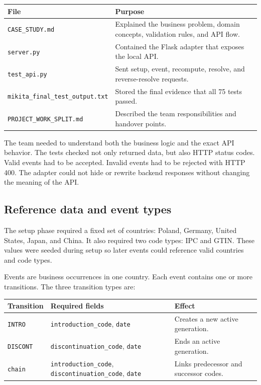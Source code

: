 \documentclass[12pt]{article}
\begin{document}
\begin{longtable}{|p{}|p{}|}
\hline
\textbf{File} & \textbf{Purpose} \\
\hline
\texttt{CASE\_STUDY.md} & Explained the business problem, domain concepts, validation rules, and API flow. \\
\hline
\texttt{server.py} & Contained the Flask adapter that exposes the local API. \\
\hline
\texttt{test\_api.py} & Sent setup, event, recompute, resolve, and reverse-resolve requests. \\
\hline
\texttt{mikita\_final\_test\_output.txt} & Stored the final evidence that all 75 tests passed. \\
\hline
\texttt{PROJECT\_WORK\_SPLIT.md} & Described the team responsibilities and handover points. \\
\hline
\end{longtable}

The team needed to understand both the business logic and the exact API behavior. The tests checked not only returned data, but also HTTP status codes. Valid events had to be accepted. Invalid events had to be rejected with HTTP 400. The adapter could not hide or rewrite backend responses without changing the meaning of the API.

\subsection{Reference data and event types}

The setup phase required a fixed set of countries: Poland, Germany, United States, Japan, and China. It also required two code types: IPC and GTIN. These values were seeded during setup so later events could reference valid countries and code types.

Events are business occurrences in one country. Each event contains one or more transitions. The three transition types are:

\begin{longtable}{|p{}|p{}|p{}|}
\hline
\textbf{Transition} & \textbf{Required fields} & \textbf{Effect} \\
\hline
\texttt{INTRO} & \texttt{introduction\_code}, \texttt{date} & Creates a new active generation. \\
\hline
\texttt{DISCONT} & \texttt{discontinuation\_code}, \texttt{date} & Ends an active generation. \\
\hline
\texttt{chain} & \texttt{introduction\_code}, \texttt{discontinuation\_code}, \texttt{date} & Links predecessor and successor codes. \\
\hline
\end{longtable}
\end{document}
